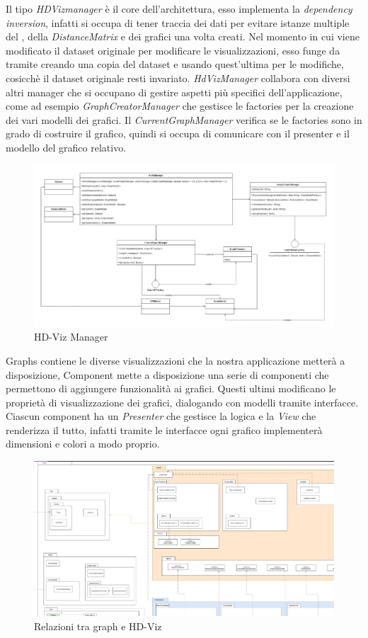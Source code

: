 \documentclass[../manuale_sviluppatore.tex]{subfiles}
\begin{document}
Il tipo \emph{HDVizmanager} è il core dell'architettura, esso implementa la \emph{dependency inversion}, 
infatti si occupa di tener traccia dei dati per evitare istanze multiple del , 
della \emph{DistanceMatrix} e dei grafici una volta creati. 
Nel momento in cui viene modificato il dataset originale per modificare le visualizzazioni, esso 
funge da tramite creando una copia del dataset e usando quest'ultima per le modifiche, cosicchè il 
dataset originale resti invariato.
\emph{HdVizManager} collabora con diversi altri manager che si occupano di gestire aspetti più 
specifici dell'applicazione, come ad esempio \emph{GraphCreatorManager} che gestisce le factories 
per la creazione dei vari modelli dei grafici. 
Il \emph{CurrentGraphManager} verifica se le factories sono in grado di costruire il grafico, 
quindi si occupa di comunicare con il presenter e il modello del grafico relativo.


\begin{figure}[H]
	\centering
	\includegraphics[width=18cm]{img/core-hdvizmanager.jpg}
	\caption{HD-Viz Manager}
\end{figure}

Graphs contiene le diverse visualizzazioni che la nostra applicazione metterà a disposizione, Component mette a disposizione una serie di componenti che permettono di aggiungere funzionalità ai grafici.
Questi ultimi modificano le proprietà di visualizzazione dei grafici, dialogando con modelli tramite interfacce. Ciascun component ha un \emph{Presenter} che gestisce la logica e la \emph{View} che renderizza il tutto,
infatti tramite le interfacce ogni grafico implementerà dimensioni e colori a modo proprio.

\begin{figure}[H]
	\centering
	\includegraphics[width=18cm]{img/graph-e-hdviz.jpg}
	\caption{Relazioni tra graph e HD-Viz}
\end{figure}
\end{document}
